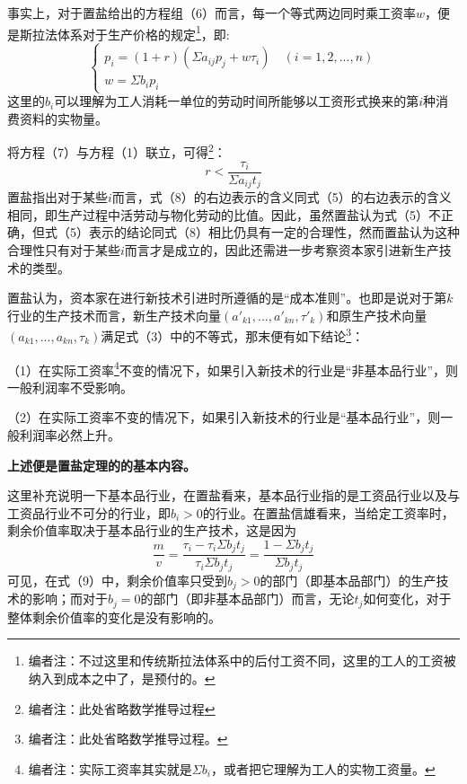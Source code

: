 \documentclass[a4paper,twoside,12pt,AutoFakeBold]{ctexart}
\begin{document}
事实上，对于置盐给出的方程组（6）而言，每一个等式两边同时乘工资率$w$，便是斯拉法体系对于生产价格的规定\footnote{编者注：不过这里和传统斯拉法体系中的后付工资不同，这里的工人的工资被纳入到成本之中了，是预付的。}，即:
\begin{equation}\tag{7}
    \begin{cases}
         p_i=(1+r)(\Sigma a_{ij}p_j+w\tau_i)\quad(i=1,2,...,n)\\
        w=\Sigma b_ip_i
    \end{cases}
\end{equation}
这里的$b_i$可以理解为工人消耗一单位的劳动时间所能够以工资形式换来的第$i$种消费资料的实物量。

将方程（7）与方程（1）联立，可得\footnote{编者注：此处省略数学推导过程}：
\begin{equation}\tag{8}
    r<\frac{\tau_i}{\Sigma a_{ij}t_j}
\end{equation}
置盐指出对于某些$i$而言，式（8）的右边表示的含义同式（5）的右边表示的含义相同，即生产过程中活劳动与物化劳动的比值。因此，虽然置盐认为式（5）不正确，但式（5）表示的结论同式（8）相比仍具有一定的合理性，然而置盐认为这种合理性只有对于某些$i$而言才是成立的，因此还需进一步考察资本家引进新生产技术的类型。

置盐认为，资本家在进行新技术引进时所遵循的是“成本准则”。也即是说对于第$k$行业的生产技术而言，新生产技术向量$(a'_{k1},...,a'_{kn},\tau'_k)$和原生产技术向量$(a_{k1},...,a_{kn},\tau_k)$满足式（3）中的不等式，那末便有如下结论\footnote{编者注：此处省略数学推导过程。}：
\begin{tcolorbox}
（1）在实际工资率\footnote{编者注：实际工资率其实就是$\Sigma b_i$，或者把它理解为工人的实物工资量。}不变的情况下，如果引入新技术的行业是“非基本品行业”，则一般利润率不受影响。

（2）在实际工资率不变的情况下，如果引入新技术的行业是“基本品行业”，则一般利润率必然上升。  
\end{tcolorbox}


\vspace{0.5cm} %

\textbf{上述便是置盐定理的的基本内容。}

\vspace{0.5cm} %

这里补充说明一下基本品行业，在置盐看来，基本品行业指的是工资品行业以及与工资品行业不可分的行业，即$b_i>0$的行业。在置盐信雄看来，当给定工资率时，剩余价值率取决于基本品行业的生产技术，这是因为
\begin{equation}\tag{9}
\frac{m}{v}=\frac{\tau_i-\tau_i\Sigma b_jt_j}{\tau_i\Sigma b_jt_j}=\frac{1-\Sigma b_jt_j}{\Sigma b_jt_j}    
\end{equation}
可见，在式（9）中，剩余价值率只受到$b_j>0$的部门（即基本品部门）的生产技术的影响；而对于$b_j=0$的部门（即非基本品部门）而言，无论$t_j$如何变化，对于整体剩余价值率的变化是没有影响的。
\end{document}
